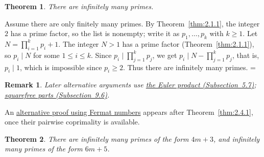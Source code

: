 \documentclass[11pt]{article}
\makeatletter
\let\nt@closedisplay\]
\def\nt@guardedclose{\@ifnextchar\par{\nt@closeafterpar}{\@ifnextchar\end{\postdisplaypenalty\@M\nt@closedisplay}{\nt@closedisplay}}}
\def\nt@closeafterpar\par{\@ifnextchar\par{\nt@closeafterpar}{\@ifnextchar\end{\postdisplaypenalty\@M\nt@closedisplay\par}{\nt@closedisplay\par}}}
\renewenvironment{proof}[1][\proofname]{\par
  \pushQED{\qed}\normalfont\topsep\medskipamount\edef\nt@afterproof{\@endparpenalty=\the\@endparpenalty\relax}\@beginparpenalty\@M\@endparpenalty\@M\let\]\nt@guardedclose\trivlist\item[]\textit{#1\@addpunct{.}} \ignorespaces}{\ifvmode\addpenalty\@M\fi\popQED\nt@afterproof\endtrivlist\@endpefalse}
\theoremstyle{ntstyle}
\newtheorem{theorem}{Theorem}[subsection]
\newtheorem*{remark}{Remark}
\makeatother
\begin{document}
\begin{theorem}\label{thm:2.1.2}\label{thm:infinitely-many-primes} There are infinitely many primes.

\end{theorem}

\begin{proof} Assume there are only finitely many primes.
  By Theorem~\ref{thm:2.1.1}, the integer $2$ has a prime factor, so the
  list is nonempty; write it as $p_1,\ldots,p_k$ with $k\ge1$.
  Let $N = \prod_{i=1}^{k} p_i + 1$. The integer $N > 1$
  has a prime factor (Theorem~\ref{thm:2.1.1}), so $p_i \mid N$ for some $1 \le i \le k$. Since
  $p_i \mid \prod_{j=1}^{k} p_j$, we get $p_i \mid N - \prod_{j=1}^{k} p_j$, that is, $p_i \mid 1$, which is
  impossible since
  $p_i\ge2$. Thus there are infinitely many primes.
\end{proof}

\begin{remark}
Later alternative arguments use \hyperref[proof:alt-2-1-2-2]{the Euler product (Subsection~5.7)}; \hyperref[proof:alt-2-1-2-3]{squarefree parts (Subsection~9.6)}.
\end{remark}


An \hyperref[proof:euclid-fermat]{alternative proof using Fermat numbers}
appears after Theorem~\ref{thm:2.4.1}, once their pairwise coprimality is available.

\begin{theorem}\label{thm:2.1.3}\label{thm:primes-in-two-progressions}
  There are infinitely many primes of the form $4m+3$, and infinitely many
  primes of the form $6m+5$.

\end{theorem}
\end{document}
